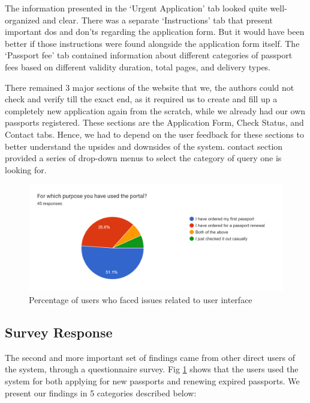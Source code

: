The information presented in the ‘Urgent Application’ tab looked quite well-organized and clear. There was a separate ‘Instructions’ tab that present important dos and don’ts regarding the application form. But it would have been better if those instructions were found alongside the application form itself. The ‘Passport fee’ tab contained information about different categories of passport fees based on different validity duration, total pages, and delivery types. 

There remained 3 major sections of the website that we, the authors could not check and verify till the exact end, as it required us to create and fill up a completely new application again from the scratch, while we already had our own passports registered. These sections are the Application Form, Check Status, and Contact tabs. Hence, we had to depend on the user feedback for these sections to better understand the upsides and downsides of the system. contact section provided a series of drop-down menus to select the category of query one is looking for.

\begin{figure}[ht]
\centering
\centerline{\includegraphics[width=\linewidth]{Figures/purpose.png}}
\vspace{-10pt}\caption{Percentage of users who faced issues related to user interface}
\label{fig:purpose}
\end{figure}

\subsection{Survey Response}

The second and more important set of findings came from other direct users of the system, through a questionnaire survey. Fig \ref{fig:purpose} shows that the users used the system for both applying for new passports and renewing expired passports. We present our findings in 5 categories described below:

